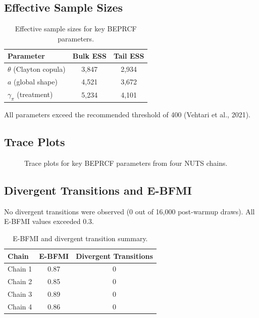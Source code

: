 \documentclass[12pt,a4paper]{article}
\begin{document}
\subsection{Effective Sample Sizes}

\begin{table}[H]
\centering
\caption{Effective sample sizes for key BEPRCF parameters.}
\label{tab:S7}
\begin{tabular}{lcc}
\toprule
\textbf{Parameter} & \textbf{Bulk ESS} & \textbf{Tail ESS} \\
\midrule
$\theta$ (Clayton copula) & 3{,}847 & 2{,}934 \\
$a$ (global shape) & 4{,}521 & 3{,}672 \\
$\gamma_\pi$ (treatment) & 5{,}234 & 4{,}101 \\
\bottomrule
\end{tabular}
\end{table}

All parameters exceed the recommended threshold of 400 (Vehtari et al., 2021).

\subsection{Trace Plots}

\begin{figure}[H]
\centering
{}
\caption{Trace plots for key BEPRCF parameters from four NUTS chains.}
\label{fig:S5}
\end{figure}

\subsection{Divergent Transitions and E-BFMI}

No divergent transitions were observed (0 out of 16,000 post-warmup draws). All E-BFMI values exceeded 0.3.

\begin{table}[H]
\centering
\caption{E-BFMI and divergent transition summary.}
\label{tab:S8}
\begin{tabular}{lcc}
\toprule
\textbf{Chain} & \textbf{E-BFMI} & \textbf{Divergent Transitions} \\
\midrule
Chain 1 & 0.87 & 0 \\
Chain 2 & 0.85 & 0 \\
Chain 3 & 0.89 & 0 \\
Chain 4 & 0.86 & 0 \\
\bottomrule
\end{tabular}
\end{table}
\end{document}

